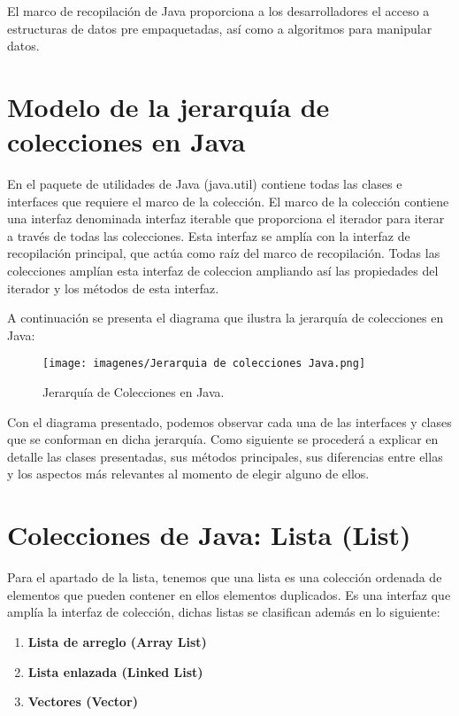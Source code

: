 \documentclass[12pt, letterpaper]{article} %
\begin{document}
El marco de recopilación de Java proporciona a los desarrolladores el acceso a estructuras de datos pre empaquetadas, así como a algoritmos para manipular datos.

\section*{Modelo de la jerarquía de colecciones en Java}
En el paquete de utilidades de Java (java.util) contiene todas las clases e interfaces que requiere el marco de la colección. El marco de la colección contiene una interfaz denominada interfaz iterable que proporciona el iterador para iterar a través de todas las colecciones. Esta interfaz se amplía con la interfaz de recopilación principal, que actúa como raíz del marco de recopilación. Todas las colecciones amplían esta interfaz de coleccion ampliando así las propiedades del iterador y los métodos de esta interfaz.
\vspace{5mm} 

A continuación se presenta el diagrama que ilustra la jerarquía de colecciones en Java:
\begin{figure}[h]
    \centering
    \texttt{[image: imagenes/Jerarquia de colecciones Java.png]}
    \caption{Jerarquía de Colecciones en Java.}
    \label{fig:jerarquia}
\end{figure}

Con el diagrama presentado, podemos observar cada una de las interfaces y clases que se conforman en dicha jerarquía. Como siguiente se procederá a explicar en detalle  las clases presentadas, sus métodos principales, sus diferencias entre ellas y los aspectos más relevantes al momento de elegir alguno de ellos.

\section{Colecciones de Java: Lista (List)}
Para el apartado de la lista, tenemos que una lista es una colección ordenada de elementos que pueden contener en ellos elementos duplicados. Es una interfaz que amplía la interfaz de colección, dichas listas se clasifican además en lo siguiente:

\begin{enumerate}
    \item \textbf{Lista de arreglo (Array List)}
    \item \textbf{Lista enlazada (Linked List)}
    \item \textbf{Vectores (Vector)}
\end{enumerate}
\end{document}
